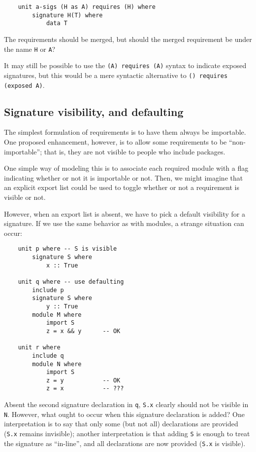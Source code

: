 \documentclass{article}
\begin{document}
\begin{verbatim}
    unit a-sigs (H as A) requires (H) where
        signature H(T) where
            data T
\end{verbatim}
%
The requirements should be merged, but should the merged requirement
be under the name \verb|H| or \verb|A|?

It may still be possible to use the \verb|(A) requires (A)| syntax to
indicate exposed signatures, but this would be a mere syntactic
alternative to \verb|() requires (exposed A)|.

\subsection{Signature visibility, and defaulting}
The simplest formulation of requirements is to have them always be
importable.  One proposed enhancement, however, is to allow some
requirements to be ``non-importable''; that is, they are not visible
to people who include packages.

One simple way of modeling this is to associate each required module
with a flag indicating whether or not it is importable or not.  Then, we
might imagine that an explicit export list could be used to toggle
whether or not a requirement is visible or not.

However, when an export list is absent, we have to pick a default
visibility for a signature.  If we use the same behavior as with
modules, a strange situation can occur:

\begin{verbatim}
    unit p where -- S is visible
        signature S where
            x :: True

    unit q where -- use defaulting
        include p
        signature S where
            y :: True
        module M where
            import S
            z = x && y      -- OK

    unit r where
        include q
        module N where
            import S
            z = y           -- OK
            z = x           -- ???
\end{verbatim}
%
Absent the second signature declaration in \verb|q|, \verb|S.x| clearly
should not be visible in \verb|N|.  However, what ought to occur when this signature
declaration is added?  One interpretation is to say that only some
(but not all) declarations are provided (\verb|S.x| remains invisible);
another interpretation is that adding \verb|S| is enough to treat
the signature as ``in-line'', and all declarations are now provided
(\verb|S.x| is visible).
\end{document}
